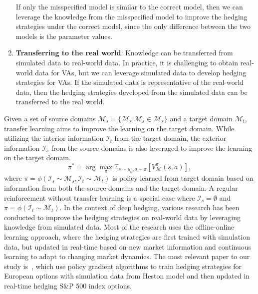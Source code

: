 \begin{enumerate}
    If only the misspecified model is similar to the correct model, then we can leverage the knowledge from the misspecified model to improve the hedging strategies under the correct model, since the only difference between the two models is the parameter values. 
    \item   \textbf{Transferring to the real world}: Knowledge can be transferred from simulated data to real-world data.
    In practice, it is challenging to obtain real-world data for VAs, but we can leverage simulated data to develop hedging strategies for VAs.
    If the simulated data is representative of the real-world data, then the hedging strategies developed from the simulated data can be transferred to the real world.
\end{enumerate}
Given a set of source domains $\bm{\mathcal{M}}_s= \{ \mathcal{M}_s| \mathcal{M}_s \in \bm{\mathcal{M}}_s\}$ and a target domain $\mathcal{M}_t$, transfer learning aims to improve the learning on the target domain.
While utilizing the interior information $\mathcal{I}_t$ from the target domain, the exterior information $\mathcal{I}_s$ from the source domains is also leveraged to improve the learning on the target domain.
\begin{equation}
    \pi^* = \arg \max_\pi \mathbb{E}_{s \sim \mu_0, a \sim \pi} \left[V_{\mathcal{M}}^\pi (s, a) \right], 
\end{equation}
where $\pi = \phi(\mathcal{I}_s \sim \bm{\mathcal{M}}_s, \mathcal{I}_t \sim \mathcal{M}_t)$ is policy learned from target domain based on information from both the source domains and the target domain.
A regular reinforcement without transfer learning is a special case where $\mathcal{I}_s = \emptyset$ and $\pi = \phi(\mathcal{I}_t \sim \mathcal{M}_t)$.
In the context of deep hedging, various research has been conducted to improve the hedging strategies on real-world data by leveraging knowledge from simulated data.
Most of the research uses the offline-online learning approach, where the hedging strategies are first trained with simulation data, but updated in real-time based on new market information and continuous learning to adapt to changing market dynamics.
The most relevant paper to our study is~\cite{xiao2021optimal}, which use policy gradient algorithms to train hedging strategies for European options with simulation data from Heston model and then updated in real-time hedging S\&P 500 index options.

